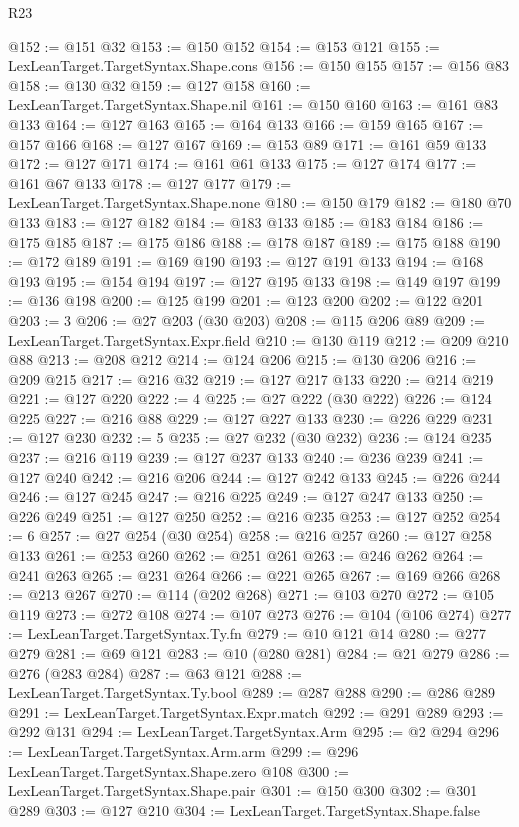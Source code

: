 \begin{lexlean}{R23}
\begin{coremodule}
@152 := @151 @32
@153 := @150 @152
@154 := @153 @121
@155 := LexLeanTarget.TargetSyntax.Shape.cons
@156 := @150 @155
@157 := @156 @83
@158 := @130 @32
@159 := @127 @158
@160 := LexLeanTarget.TargetSyntax.Shape.nil
@161 := @150 @160
@163 := @161 @83 @133
@164 := @127 @163
@165 := @164 @133
@166 := @159 @165
@167 := @157 @166
@168 := @127 @167
@169 := @153 @89
@171 := @161 @59 @133
@172 := @127 @171
@174 := @161 @61 @133
@175 := @127 @174
@177 := @161 @67 @133
@178 := @127 @177
@179 := LexLeanTarget.TargetSyntax.Shape.none
@180 := @150 @179
@182 := @180 @70 @133
@183 := @127 @182
@184 := @183 @133
@185 := @183 @184
@186 := @175 @185
@187 := @175 @186
@188 := @178 @187
@189 := @175 @188
@190 := @172 @189
@191 := @169 @190
@193 := @127 @191 @133
@194 := @168 @193
@195 := @154 @194
@197 := @127 @195 @133
@198 := @149 @197
@199 := @136 @198
@200 := @125 @199
@201 := @123 @200
@202 := @122 @201
@203 := 3
@206 := @27 @203 (@30 @203)
@208 := @115 @206 @89
@209 := LexLeanTarget.TargetSyntax.Expr.field
@210 := @130 @119
@212 := @209 @210 @88
@213 := @208 @212
@214 := @124 @206
@215 := @130 @206
@216 := @209 @215
@217 := @216 @32
@219 := @127 @217 @133
@220 := @214 @219
@221 := @127 @220
@222 := 4
@225 := @27 @222 (@30 @222)
@226 := @124 @225
@227 := @216 @88
@229 := @127 @227 @133
@230 := @226 @229
@231 := @127 @230
@232 := 5
@235 := @27 @232 (@30 @232)
@236 := @124 @235
@237 := @216 @119
@239 := @127 @237 @133
@240 := @236 @239
@241 := @127 @240
@242 := @216 @206
@244 := @127 @242 @133
@245 := @226 @244
@246 := @127 @245
@247 := @216 @225
@249 := @127 @247 @133
@250 := @226 @249
@251 := @127 @250
@252 := @216 @235
@253 := @127 @252
@254 := 6
@257 := @27 @254 (@30 @254)
@258 := @216 @257
@260 := @127 @258 @133
@261 := @253 @260
@262 := @251 @261
@263 := @246 @262
@264 := @241 @263
@265 := @231 @264
@266 := @221 @265
@267 := @169 @266
@268 := @213 @267
@270 := @114 (@202 @268)
@271 := @103 @270
@272 := @105 @119
@273 := @272 @108
@274 := @107 @273
@276 := @104 (@106 @274)
@277 := LexLeanTarget.TargetSyntax.Ty.fn
@279 := @10 @121 @14
@280 := @277 @279
@281 := @69 @121
@283 := @10 (@280 @281)
@284 := @21 @279
@286 := @276 (@283 @284)
@287 := @63 @121
@288 := LexLeanTarget.TargetSyntax.Ty.bool
@289 := @287 @288
@290 := @286 @289
@291 := LexLeanTarget.TargetSyntax.Expr.match
@292 := @291 @289
@293 := @292 @131
@294 := LexLeanTarget.TargetSyntax.Arm
@295 := @2 @294
@296 := LexLeanTarget.TargetSyntax.Arm.arm
@299 := @296 LexLeanTarget.TargetSyntax.Shape.zero @108
@300 := LexLeanTarget.TargetSyntax.Shape.pair
@301 := @150 @300
@302 := @301 @289
@303 := @127 @210
@304 := LexLeanTarget.TargetSyntax.Shape.false

\end{coremodule}
\end{lexlean}
